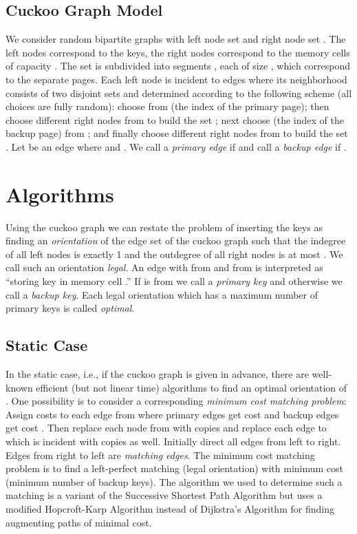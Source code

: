 \let\accentvec\vec \documentclass{llncs}
\newcommand{\ie}{i.e.}
\begin{document}
\subsection{Cuckoo Graph Model}
\label{sec:graphModel}
We consider random bipartite graphs  with left node set  and right node set .
The left nodes correspond to the keys, the right nodes correspond to the memory cells of capacity . The set  is subdivided into  segments , each of size , which correspond to the separate pages.
Each left node  is incident to  edges where its neighborhood  consists of two disjoint sets  and  determined according to the following scheme (all choices are fully random): choose  from  (the index of the primary page); then choose  different right nodes from  to build the set ; next choose  (the index of the backup page) from ; and finally choose  different right nodes from  to build the set . Let  be an edge where  and . We call  a \emph{primary edge} if  and call  a \emph{backup edge} if .

\section{Algorithms}
Using the cuckoo graph we can restate the problem of inserting the keys as finding an \emph{orientation} of the edge set of the cuckoo graph  such that the indegree of all left nodes is exactly 1 and the outdegree of all right nodes is at most .
We call such an orientation \emph{legal}. An edge  with  from  and  from  is interpreted as ``storing key  in memory cell .'' If  is from  we call  a \emph{primary key} and otherwise we call  a \emph{backup key}.
Each legal orientation which has a maximum number of primary keys is called \emph{optimal}.

\subsection{Static Case}
In the static case, \ie, if the cuckoo graph  is given in advance, 
there are well-known efficient (but not linear time) algorithms to find an optimal orientation of . One possibility is 
to consider a corresponding \emph{minimum cost matching problem}:
Assign costs to each edge from  where primary edges get cost  and backup edges get cost .
Then replace each node  from  with  copies and replace each edge to which  is incident with  copies as well.
Initially direct all edges from left to right. Edges from right to left are \emph{matching edges}. The minimum cost matching problem is to find a left-perfect matching (legal orientation) with minimum cost (minimum number of backup keys).
The algorithm we used to determine such a matching is a variant of the Successive Shortest Path Algorithm \cite{network_flows} but uses a modified Hopcroft-Karp Algorithm instead of Dijkstra's Algorithm for finding augmenting paths of minimal cost. 
\end{document}
